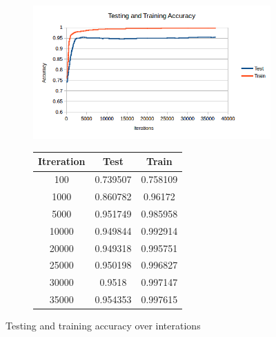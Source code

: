 \documentclass[10pt,twocolumn,letterpaper]{article}
\begin{document}
\begin{figure}[b]	
\begin{center}

	\begin{subfigure}{0.5\textwidth}
  	\includegraphics[width=1.0\linewidth]{Accuracy_chart.png}
  	\end{subfigure}
   
   \begin{subfigure}{0.3\textwidth}
   \begin{tabular}{| c | c | c | }
   \hline
	Itreration	&	Test	&	Train\\ 
 	\hline 
	100	&	0.739507	&	0.758109\\ 
 	\hline 
	1000	&	0.860782	&	0.96172\\ 
 	\hline 
	5000	&	0.951749	&	0.985958\\ 
 	\hline 
	10000	&	0.949844	&	0.992914\\ 
 	\hline 
	20000	&	0.949318	&	0.995751\\ 
 	\hline 
	25000	&	0.950198	&	0.996827\\ 
 	\hline 
	30000	&	0.9518	&	0.997147\\ 
 	\hline 
	35000	&	0.954353	&	0.997615\\
	\hline
	\end{tabular}   
	\end{subfigure}
	
\end{center}
\caption{Testing and training accuracy over interations}
\label{fig:accuracy}
\end{figure}
\end{document}
